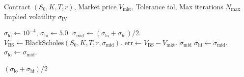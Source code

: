 \begin{algorithm}[tp]
\caption{Implied volatility inversion via bisection}
\label{alg:implied_vol}
\small
\begin{algorithmic}[1]
\REQUIRE Contract $(S_0, K, T, r)$, Market price $V_{\text{mkt}}$, Tolerance $\text{tol}$, Max iterations $N_{\max}$
\ENSURE Implied volatility $\sigma_{\text{IV}}$

\STATE $\sigma_{\text{lo}} \leftarrow 10^{-4}$, \quad $\sigma_{\text{hi}} \leftarrow 5.0$.
    \STATE $\sigma_{\text{mid}} \leftarrow (\sigma_{\text{lo}} + \sigma_{\text{hi}}) / 2$.
    \STATE $V_{\text{BS}} \leftarrow \text{BlackScholes}(S_0, K, T, r, \sigma_{\text{mid}})$.
    \STATE $\text{err} \leftarrow V_{\text{BS}} - V_{\text{mkt}}$.
        \RETURN $\sigma_{\text{mid}}$
        \STATE $\sigma_{\text{hi}} \leftarrow \sigma_{\text{mid}}$.
    \ELSE
        \STATE $\sigma_{\text{lo}} \leftarrow \sigma_{\text{mid}}$.
    \ENDIF
\ENDFOR

\RETURN $(\sigma_{\text{lo}} + \sigma_{\text{hi}}) / 2$
\end{algorithmic}
\end{algorithm}
